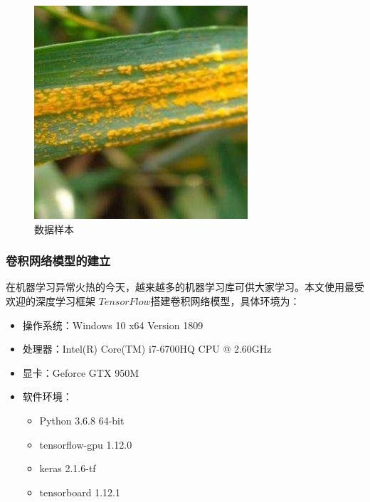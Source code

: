 \begin{figure}[H]
{\begin{minipage}[t]{.2\textwidth}
          \includegraphics[width=\textwidth]{resource/third/rust(3).jpg} 
        \end{minipage}
      }
      \caption{数据样本}
      \label{Figure.Third.6}
    \end{figure}


  \subsubsection{\hei\sihao\textbf{卷积网络模型的建立}}
    在机器学习异常火热的今天，越来越多的机器学习库可供大家学习。本文使用最受欢迎的深度学习框架
    $TensorFlow$搭建卷积网络模型，具体环境为：

    {\hei\dawu
    \begin{itemize}
      \item 操作系统：Windows 10 x64 Version 1809
      \item 处理器：Intel(R) Core(TM) i7-6700HQ CPU @ 2.60GHz
      \item 显卡：Geforce GTX 950M
      \item 软件环境：
            \begin{itemize}
              \item Python 3.6.8 64-bit
              \item tensorflow-gpu 1.12.0
              \item keras 2.1.6-tf
              \item tensorboard 1.12.1
            \end{itemize}
    \end{itemize}
    }

